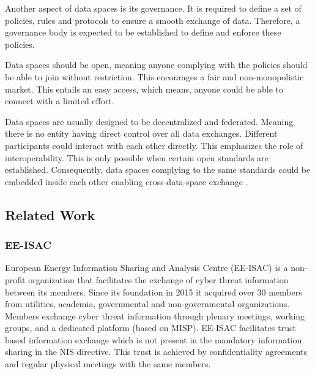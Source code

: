 \documentclass{article}
\begin{document}
Another aspect of data spaces is its governance. It is required to define a set of policies, rules and protocols to ensure a smooth exchange of data. Therefore, a governance body is expected to be established to define and enforce these policies. \cite{reiberg_what_2022}

Data spaces should be open, meaning anyone complying with the policies should be able to join without restriction. This encourages a fair and non-monopolistic market. This entails an easy access, which means, anyone could be able to connect with a limited effort.

Data spaces are usually designed to be decentralized and federated. Meaning there is no entity having direct control over all data exchanges. Different participants could interact with each other directly. This emphasizes the role of interoperability. This is only possible when certain open standards are established. Consequently, data spaces complying to the same standards could be embedded inside each other enabling cross-data-space exchange \cite{reiberg_what_2022}.

\noindent{}

\subsection{Related Work}

\subsubsection*{EE-ISAC}
European Energy Information Sharing and Analysis Centre (EE-ISAC) is a non-profit organization that facilitates the exchange of cyber threat information between its members. Since its foundation in 2015 it acquired over 30 members from utilities, academia, governmental and non-governmental organizations. Members exchange cyber threat information through plenary meetings, working groups, and a dedicated platform (based on MISP). EE-ISAC facilitates trust based information exchange which is not present in the mandatory information sharing in the NIS directive. This trust is achieved by confidentiality agreements and regular physical meetings with the same members. 
\cite{wallis_ee-isacpractical_2022}
\end{document}

